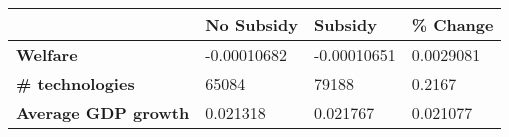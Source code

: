 \begin{tabular}{|l|l|l|l|}
\hline
&\textbf{No Subsidy}&\textbf{Subsidy}&\textbf{\% Change}\\\hline
\textbf{Welfare}&-0.00010682&-0.00010651&0.0029081\\\hline
\textbf{\# technologies}&65084&79188&0.2167\\\hline
\textbf{Average GDP growth}&0.021318&0.021767&0.021077\\\hline
\end{tabular}

